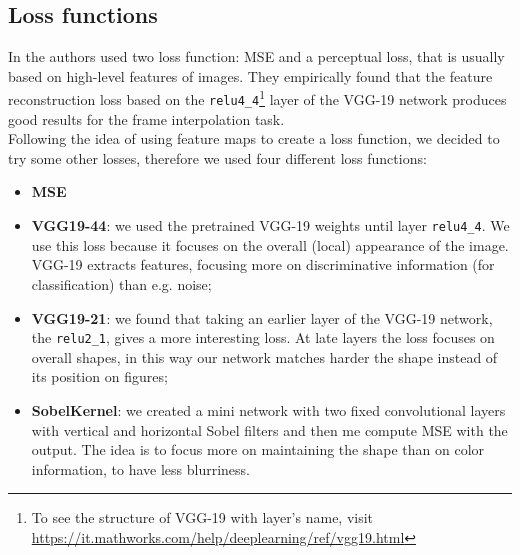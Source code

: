 \documentclass[11pt, a4paper]{article}
\begin{document}
	\subsection{Loss functions}
	In \cite{mainpaper} the authors used two loss function: MSE and a perceptual loss, that is usually based on high-level features of images. They empirically found that the feature reconstruction loss based on the \texttt{relu4\_4}\footnote{\label{vgg-structure}To see the structure of VGG-19 with layer's name, visit \url{https://it.mathworks.com/help/deeplearning/ref/vgg19.html}} layer of the VGG-19 network produces good results for the frame interpolation task.\\
	Following the idea of using feature maps to create a loss function, we decided to try some other losses, therefore we used four different loss functions:
	\begin{itemize}
		\item \textbf{MSE}
		\item \textbf{VGG19-44}: we used the pretrained VGG-19 weights until layer \texttt{relu4\_4}. We use this loss because it focuses on the overall (local) appearance of the image. VGG-19 extracts features, focusing more on discriminative information (for classification) than e.g. noise;
		\item \textbf{VGG19-21}: we found that taking an earlier layer of the VGG-19 network, the \texttt{relu2\_1}, gives a more interesting loss. At late layers the loss focuses on overall shapes, in this way our network matches harder the shape instead of its position on figures;
		\item \textbf{SobelKernel}: we created a mini network with two fixed convolutional layers with vertical and horizontal Sobel filters and then me compute MSE with the output. The idea is to focus more on maintaining the shape than on color information, to have less blurriness.
	\end{itemize}
\end{document}

